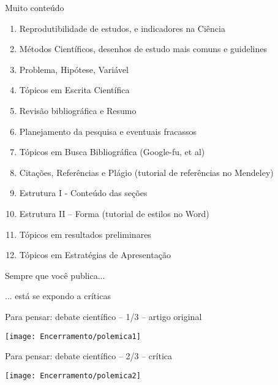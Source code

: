 \documentclass{beamer}
\begin{document}
\begin{frame}{Muito conteúdo}
  \begin{enumerate}
    \scriptsize
  \item Reprodutibilidade de estudos, e indicadores na Ciência
  \item Métodos Científicos, desenhos de estudo mais comuns e guidelines
  \item Problema, Hipótese, Variável
  \item Tópicos em Escrita Científica
  \item Revisão bibliográfica e Resumo
  \item Planejamento da pesquisa e eventuais fracassos
  \item Tópicos em Busca Bibliográfica (Google-fu, et al)
  \item Citações, Referências e Plágio (tutorial de referências no Mendeley)
  \item Estrutura I - Conteúdo das seções
  \item Estrutura II – Forma (tutorial de estilos no Word)
  \item Tópicos em resultados preliminares
  \item Tópicos em Estratégias de Apresentação
  \end{enumerate}
\end{frame}

\begin{frame}
  \begin{center}
    \Large

    Sempre que você publica...

    \bigskip
    \bigskip
    ... está se expondo a críticas
  \end{center}
\end{frame}

\begin{frame}{\tiny Para pensar: debate científico -- 1/3 -- artigo original}
  \begin{center}
    \texttt{[image: Encerramento/polemica1]}
  \end{center}
\end{frame}

\begin{frame}{\tiny Para pensar: debate científico -- 2/3 -- crítica}
  \begin{center}
    \texttt{[image: Encerramento/polemica2]}
  \end{center}
\end{frame}
\end{document}
